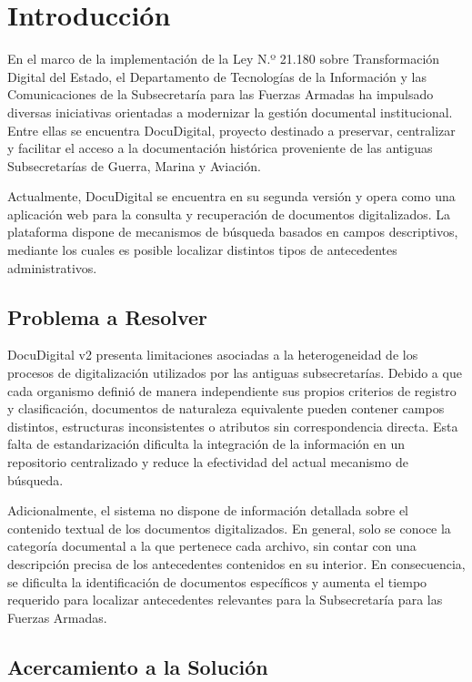 \section{Introducción}

En el marco de la implementación de la Ley N.º 21.180 sobre Transformación Digital del Estado, el Departamento de Tecnologías de la Información y las Comunicaciones de la Subsecretaría para las Fuerzas Armadas ha impulsado diversas iniciativas orientadas a modernizar la gestión documental institucional. Entre ellas se encuentra DocuDigital, proyecto destinado a preservar, centralizar y facilitar el acceso a la documentación histórica proveniente de las antiguas Subsecretarías de Guerra, Marina y Aviación.

Actualmente, DocuDigital se encuentra en su segunda versión y opera como una aplicación web para la consulta y recuperación de documentos digitalizados. La plataforma dispone de mecanismos de búsqueda basados en campos descriptivos, mediante los cuales es posible localizar distintos tipos de antecedentes administrativos.
 
\subsection{Problema a Resolver}

DocuDigital v2 presenta limitaciones asociadas a la heterogeneidad de los procesos de digitalización utilizados por las antiguas subsecretarías. Debido a que cada organismo definió de manera independiente sus propios criterios de registro y clasificación, documentos de naturaleza equivalente pueden contener campos distintos, estructuras inconsistentes o atributos sin correspondencia directa. Esta falta de estandarización dificulta la integración de la información en un repositorio centralizado y reduce la efectividad del actual mecanismo de búsqueda.

Adicionalmente, el sistema no dispone de información detallada sobre el contenido textual de los documentos digitalizados. En general, solo se conoce la categoría documental a la que pertenece cada archivo, sin contar con una descripción precisa de los antecedentes contenidos en su interior. En consecuencia, se dificulta la identificación de documentos específicos y aumenta el tiempo requerido para localizar antecedentes relevantes para la Subsecretaría para las Fuerzas Armadas.

\subsection{Acercamiento a la Solución }

